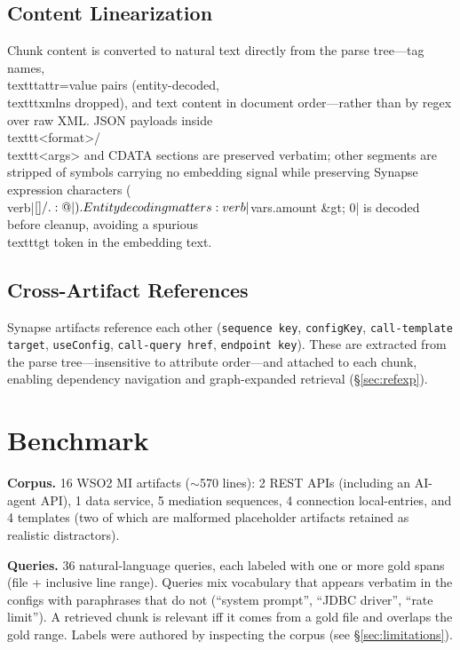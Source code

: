 \documentclass[conference]{IEEEtran}
\begin{document}
\subsection{Content Linearization}
Chunk content is converted to natural text directly from the parse tree---tag names, \\texttt{attr=value} pairs (entity-decoded, \\texttt{xmlns} dropped), and text content in document order---rather than by regex over raw XML. JSON payloads inside \\texttt{<format>}/\\texttt{<args>} and CDATA sections are preserved verbatim; other segments are stripped of symbols carrying no embedding signal while preserving Synapse expression characters (\\verb|$ { } [ ] / . : @|). Entity decoding matters: \\verb|${vars.amount &gt; 0}| is decoded before cleanup, avoiding a spurious \\texttt{gt} token in the embedding text.

\subsection{Cross-Artifact References}
Synapse artifacts reference each other (\texttt{sequence key}, \texttt{configKey}, \texttt{call-template target}, \texttt{useConfig}, \texttt{call-query href}, \texttt{endpoint key}). These are extracted from the parse tree---insensitive to attribute order---and attached to each chunk, enabling dependency navigation and graph-expanded retrieval (\S\ref{sec:refexp}).

\section{Benchmark}\label{sec:benchmark}
\textbf{Corpus.} 16 WSO2 MI artifacts ($\sim$570 lines): 2 REST APIs (including an AI-agent API), 1 data service, 5 mediation sequences, 4 connection local-entries, and 4 templates (two of which are malformed placeholder artifacts retained as realistic distractors).

\textbf{Queries.} 36 natural-language queries, each labeled with one or more gold spans (file + inclusive line range). Queries mix vocabulary that appears verbatim in the configs with paraphrases that do not (``system prompt'', ``JDBC driver'', ``rate limit''). A retrieved chunk is relevant iff it comes from a gold file and overlaps the gold range. Labels were authored by inspecting the corpus (see \S\ref{sec:limitations}).
\end{document}
